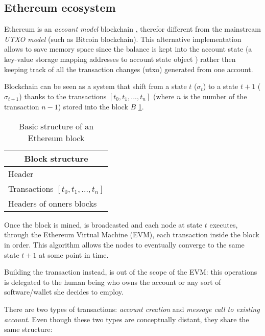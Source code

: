 \subsection{Ethereum ecosystem}

Ethereum is an \textit{account model} blockchain \cite{etherum_whitepaper}, therefor different from the mainstream \textit{UTXO model}  (such as Bitcoin blockchain). This alternative implementation allows to save memory space since the balance is kept into the account state (a key-value storage mapping addresses to account state object \cite{ethereum_yellowpaper}) rather then keeping track of all the transaction changes (utxo) generated from one account.

Blockchain can be seen as a system that shift from a state $t$ ($\sigma_t$) to a state $t+1$ ($\sigma_{t+1}$) thanks to the transactions $[t_0,t_1,...,t_n]$ (where $n$ is the number of the transaction $n-1$) stored into the block $B$ \ref{table:2}.


\begin{table}[h!]
\centering
\begin{tabular}{ |p{3cm}|  }
\hline
\multicolumn{1}{|c|}{Block structure} \\
\hline
\hline
Header \\
\hline
Transactions $[t_0,t_1,...,t_n]$ \\
\hline
Headers of onners blocks\\
\hline
\end{tabular}
\caption{Basic structure of an Ethereum block}
\label{table:2}
\end{table}

Once the block is mined, is broadcasted and each node at state $t$  executes, through the Ethereum Virtual Machine (EVM), each transaction inside the block in order.
This algorithm allows the nodes to eventually converge to the same state $t+1$ at some point in time.

Building the transaction instead, is out of the scope of the EVM: this operations is delegated to the human being who owns the account or any sort of software/wallet she decides to employ.

There are two types of transactions: \textit{account creation} and \textit{message call to existing account}. Even though these two types are conceptually distant, they share the same structure:

